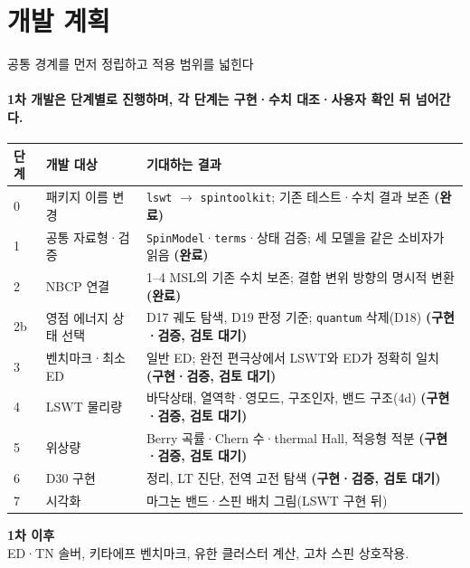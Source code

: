 \section[개발 계획]{개발 계획}

\begin{frame}[plain,label=section-plan]
  \sectionpage
\end{frame}

\begin{frame}[label=development-roadmap]{공통 경계를 먼저 정립하고 적용 범위를 넓힌다}
  \framesubtitle{1차 개발은 단계별로 진행하며, 각 단계는 구현·수치 대조·사용자 확인 뒤 넘어간다.}
  \footnotesize
  \begin{tabularx}{\textwidth}{@{}p{0.8cm}p{3.3cm}Y@{}}
    \toprule
    단계 & 개발 대상 & 기대하는 결과 \\
     & 패키지 이름 변경 & \texttt{lswt} $\to$ \texttt{spintoolkit}; 기존 테스트·수치 결과 보존 \textbf{(완료)} \\
    1 & 공통 자료형·검증 & \texttt{SpinModel}·\texttt{terms}·상태 검증; 세 모델을 같은 소비자가 읽음 \textbf{(완료)} \\
    2 & NBCP 연결 & 1--4 MSL의 기존 수치 보존; 결합 변위 방향의 명시적 변환 \textbf{(완료)} \\
    2b & 영점 에너지 상태 선택 & D17 궤도 탐색, D19 판정 기준; \texttt{quantum} 삭제(D18) \textbf{(구현·검증, 검토 대기)} \\
    3 & 벤치마크·최소 ED & 일반 ED; 완전 편극상에서 LSWT와 ED가 정확히 일치 \textbf{(구현·검증, 검토 대기)} \\
    4 & LSWT 물리량 & 바닥상태, 열역학·영모드, 구조인자, 밴드 구조(4d) \textbf{(구현·검증, 검토 대기)} \\
    5 & 위상량 & Berry 곡률·Chern 수·thermal Hall, 적응형 적분 \textbf{(구현·검증, 검토 대기)} \\
    6 & D30 구현 & 정리, LT 진단, 전역 고전 탐색 \textbf{(구현·검증, 검토 대기)} \\
    7 & 시각화 & 마그논 밴드·스핀 배치 그림(LSWT 구현 뒤) \\
    \bottomrule
  \end{tabularx}
  \par\medskip
  \textbf{1차 이후}\\[0.4em]
  ED·TN 솔버, 키타에프 벤치마크, 유한 클러스터 계산, 고차 스핀 상호작용.\\[0.4em]
\end{frame}

